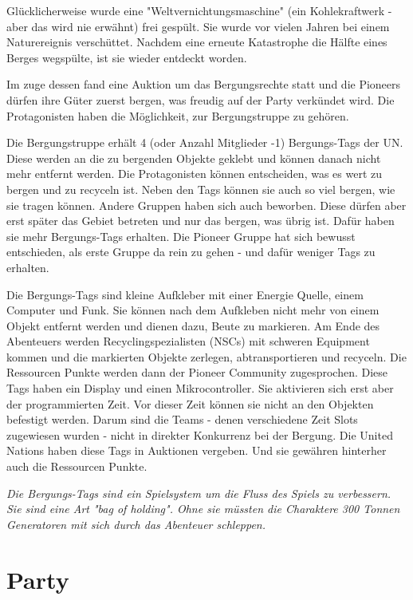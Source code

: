 Glücklicherweise wurde eine "Weltvernichtungsmaschine" (ein Kohlekraftwerk - aber das wird nie erwähnt) frei gespült. Sie wurde vor vielen Jahren bei einem Naturereignis verschüttet. Nachdem eine erneute Katastrophe die Hälfte eines Berges wegspülte, ist sie wieder entdeckt worden.

Im zuge dessen fand eine Auktion um das Bergungsrechte statt und die Pioneers dürfen ihre Güter zuerst bergen, was freudig auf der Party verkündet wird. Die Protagonisten haben die Möglichkeit, zur Bergungstruppe zu gehören.

Die Bergungstruppe erhält 4 (oder Anzahl Mitglieder -1) Bergungs-Tags der UN. Diese werden an die zu bergenden Objekte geklebt und können danach nicht mehr entfernt werden. Die Protagonisten können entscheiden, was es wert zu bergen und zu recyceln ist. Neben den Tags können sie auch so viel bergen, wie sie tragen können.
Andere Gruppen haben sich auch beworben. Diese dürfen aber erst später das Gebiet betreten und nur das bergen, was übrig ist. Dafür haben sie mehr Bergungs-Tags erhalten. Die Pioneer Gruppe hat sich bewusst entschieden, als erste Gruppe da rein zu gehen - und dafür weniger Tags zu erhalten.

\begin{sidebarBox}[title=Bergungs-Tags]
Die Bergungs-Tags sind kleine Aufkleber mit einer Energie Quelle, einem Computer und Funk. Sie können nach dem Aufkleben nicht mehr von einem Objekt entfernt werden und dienen dazu, Beute zu markieren. Am Ende des Abenteuers werden Recyclingspezialisten (NSCs) mit schweren Equipment kommen und die markierten Objekte zerlegen, abtransportieren und recyceln. Die Ressourcen Punkte werden dann der Pioneer Community zugesprochen.
Diese Tags haben ein Display und einen Mikrocontroller. Sie aktivieren sich erst aber der programmierten Zeit. Vor dieser Zeit können sie nicht an den Objekten befestigt werden. Darum sind die Teams - denen verschiedene Zeit Slots zugewiesen wurden - nicht in direkter Konkurrenz bei der Bergung.
Die United Nations haben diese Tags in Auktionen vergeben. Und sie gewähren hinterher auch die Ressourcen Punkte.
\end{sidebarBox}

\emph{Die Bergungs-Tags sind ein Spielsystem um die Fluss des Spiels zu verbessern. Sie sind eine Art "bag of holding". Ohne sie müssten die Charaktere 300 Tonnen Generatoren mit sich durch das Abenteuer schleppen.}


\section{Party}

